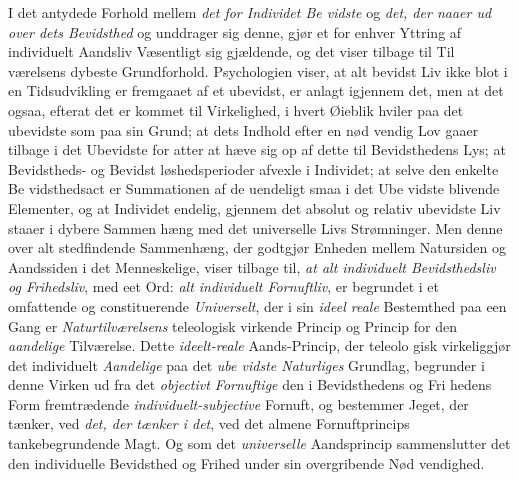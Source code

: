 I det antydede Forhold mellem \emph{det for Individet Be\-%
vidste} og \emph{det, der naaer ud over dets Bevidsthed} og
unddrager sig denne, gjør et for enhver Yttring af individuelt
Aandsliv Væsentligt sig gjældende, og det viser tilbage til Til\-%
værelsens dybeste Grundforhold. Psychologien viser, at alt
bevidst Liv ikke blot i en Tidsudvikling er fremgaaet af et
ubevidst, er anlagt igjennem det, men at det ogsaa, efterat
det er kommet til Virkelighed, i hvert Øieblik hviler paa det
ubevidste som paa sin Grund; at dets Indhold efter en nød\-%
vendig Lov gaaer tilbage i det Ubevidste for atter at hæve sig
op af dette til Bevidsthedens Lys; at Bevidstheds- og Bevidst\-%
løshedsperioder afvexle i Individet; at selve den enkelte Be\-%
vidsthedsact er Summationen af de uendeligt smaa i det Ube\-%
vidste blivende Elementer, og at Individet endelig, gjennem
det absolut og relativ ubevidste Liv staaer i dybere Sammen\-%
hæng med det universelle Livs Strømninger. Men denne over\-%
alt stedfindende Sammenhæng, der godtgjør Enheden mellem
Natursiden og Aandssiden i det Menneskelige, viser tilbage til,
\emph{at alt individuelt Bevidsthedsliv og Frihedsliv}, med
eet Ord: \emph{alt individuelt Fornuftliv}, er begrundet i et
omfattende og constituerende \emph{Universelt}, der i sin \emph{ideel\-%
reale} Bestemthed paa een Gang er \emph{Naturtilværelsens}
 teleologisk virkende Princip og Princip for den \emph{aandelige}
Tilværelse. Dette \emph{ideelt-reale} Aands-Princip, der teleolo\-%
gisk virkeliggjør det individuelt \emph{Aandelige} paa det \emph{ube\-%
vidste Naturliges} Grundlag, begrunder i denne Virken ud
fra det \emph{objectivt Fornuftige} den i Bevidsthedens og Fri\-%
hedens Form fremtrædende \emph{individuelt-subjective} Fornuft,
og bestemmer Jeget, der tænker, ved \emph{det, der tænker i
det}, ved det almene Fornuftprincips tankebegrundende Magt.
Og som det \emph{universelle} Aandsprincip sammenslutter det den
individuelle Bevidsthed og Frihed under sin overgribende Nød\-%
vendighed.

